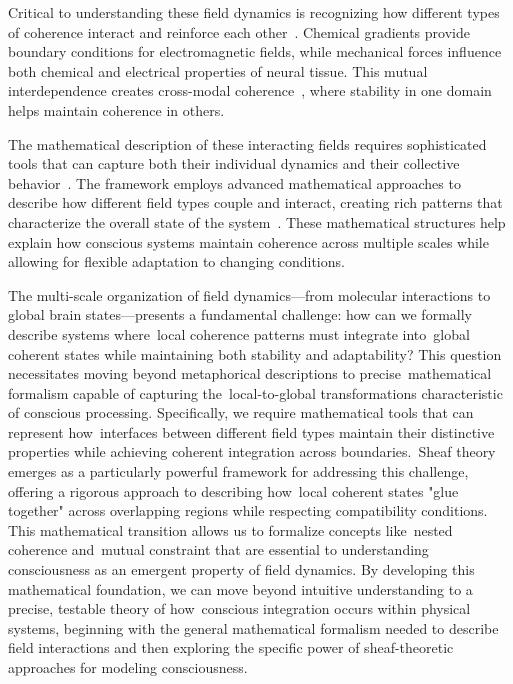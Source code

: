 Critical to understanding these field dynamics is recognizing how different types of coherence interact and reinforce each other~\cite{pinotsis2023vivo}. Chemical gradients provide boundary conditions for electromagnetic fields, while mechanical forces influence both chemical and electrical properties of neural tissue. This mutual interdependence creates cross-modal coherence~\cite{pellerin2004neuroenergetics}, where stability in one domain helps maintain coherence in others.

The mathematical description of these interacting fields requires sophisticated tools that can capture both their individual dynamics and their collective behavior~\cite{da2024mathematical}. The framework employs advanced mathematical approaches to describe how different field types couple and interact, creating rich patterns that characterize the overall state of the system~\cite{amil2024theta}. These mathematical structures help explain how conscious systems maintain coherence across multiple scales while allowing for flexible adaptation to changing conditions.

The multi-scale organization of field dynamics—from molecular interactions to global brain states—presents a fundamental challenge: how can we formally describe systems where~local coherence patterns must integrate into~global coherent states while maintaining both stability and adaptability? This question necessitates moving beyond metaphorical descriptions to precise~mathematical formalism capable of capturing the~local-to-global transformations characteristic of conscious processing. Specifically, we require mathematical tools that can represent how~interfaces between different field types maintain their distinctive properties while achieving coherent integration across boundaries.~Sheaf theory emerges as a particularly powerful framework for addressing this challenge, offering a rigorous approach to describing how~local coherent states "glue together" across overlapping regions while respecting compatibility conditions. This mathematical transition allows us to formalize concepts like~nested coherence and~mutual constraint that are essential to understanding consciousness as an emergent property of field dynamics. By developing this mathematical foundation, we can move beyond intuitive understanding to a precise, testable theory of how~conscious integration occurs within physical systems, beginning with the general mathematical formalism needed to describe field interactions and then exploring the specific power of sheaf-theoretic approaches for modeling consciousness.
